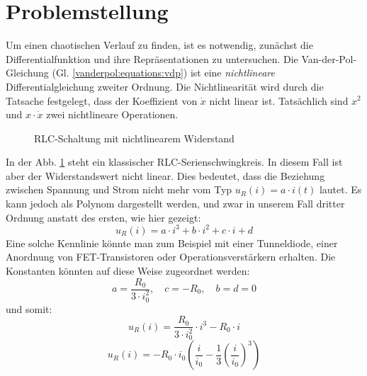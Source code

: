 %
%
\section{Problemstellung
\label{vanderpol:section:problemstellung}}
Um einen chaotischen Verlauf zu finden, ist es notwendig, zunächst die Differentialfunktion und ihre Repräsentationen zu untersuchen.
Die Van-der-Pol-Gleichung (Gl. \ref{vanderpol:equations:vdp}) ist eine {\em nichtlineare} Differentialgleichung zweiter Ordnung. 
Die Nichtlinearität wird durch die Tatsache festgelegt, dass der Koeffizient von $\dot{x}$ nicht linear ist. Tatsächlich sind $x^{2}$ und $x \cdot \dot{x}$ zwei nichtlineare Operationen.
\begin{figure}
\centering
{} 
\caption{RLC-Schaltung mit nichtlinearem Widerstand \label{vanderpol:figures:circuit}}
\end{figure}
In der Abb. \ref{vanderpol:figures:circuit} steht ein klassischer RLC-Serienschwingkreis. In diesem Fall ist aber der Widerstandswert nicht linear. Dies bedeutet, dass die Beziehung zwischen Spannung und Strom nicht mehr vom Typ $u_R(i) = a \cdot i(t)$ lautet. Es kann jedoch als Polynom dargestellt werden, und zwar in unserem Fall dritter Ordnung anstatt des ersten, wie hier gezeigt: 
\begin{equation}
u_R(i) = a \cdot i^3 + b \cdot i^2 + c \cdot i + d 
\end{equation}
Eine solche Kennlinie könnte man zum Beispiel mit einer Tunneldiode, einer Anordnung von FET-Transistoren oder Operationsverstärkern erhalten. Die Konstanten könnten auf diese Weise zugeordnet werden:
\begin{equation*}
a = \frac{R_0}{3 \cdot i_0^2}, \quad c = -R_0, \quad b = d = 0 
\end{equation*}
und somit:
\begin{equation*}
u_R(i) = \frac{R_0}{3 \cdot i_0^2} \cdot i^3 - R_0 \cdot i  
\end{equation*}
\begin{equation*}
u_R(i) = -R_0 \cdot i_0 \left(\frac{i}{i_0} - \frac{1}{3} \left(\frac{i}{i_0} \right)^3 \right)   
\end{equation*}
